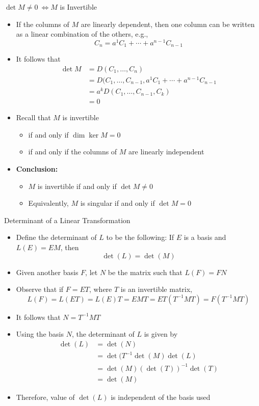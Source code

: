 \documentclass[usenames,dvipsnames,10pt]{beamer}
\begin{document}
\begin{frame}
  {$\det M \ne 0\ \iff M$ is Invertible}

  \begin{itemize}
  \item If the columns of $M$ are linearly dependent, then one column can be written as a linear combination of the others, e.g.,
    \[ C_n = a^1C_1 + \cdots + a^{n-1}C_{n-1}
    \]
  \item It follows that
    \begin{align*}
      \det M &= D(C_1, \dots, C_n)\\
             &= D(C_1, \dots, C_{n-1},a^1C_1 + \cdots + a^{n-1}C_{n-1}\\
             &= a^kD(C_1, \dots, C_{n-1},C_k)\\
             &= 0
    \end{align*}
  \item Recall that $M$ is invertible
    \begin{itemize}
    \item if and only if $\dim \ker M = 0$
    \item if and only if the columns of $M$ are linearly independent
    \end{itemize}
  \item {\bf Conclusion:}
    \begin{itemize}
    \item $M$ is invertible if and only if $\det M \ne 0$
    \item Equivalently, $M$ is singular if and only if $\det M = 0$
    \end{itemize}
  \end{itemize}
\end{frame}

\begin{frame}
  {Determinant of a Linear Transformation}

  \begin{itemize}
  \item Define the determinant of $L$ to be the following: If $E$ is a basis and $L(E) = EM$, then
    \[
      \det(L) = \det(M)
    \]
  \item Given another basis $F$, let $N$ be the matrix such that $L(F) = FN$
  \item Observe that if $F = ET$, where $T$ is an invertible matrix,
    \[
      L(F) = L(ET) = L(E)T = EMT = ET(T^{-1}MT)= F(T^{-1}MT)
    \]
  \item It follows that $N = T^{-1}MT$
  \item Using the basis $N$, the determinant of $L$ is given by
    \begin{align*}
      \det(L) &= \det(N)\\
              &= \det(T^{-1}\det(M)\det(L)\\
              &= \det(M)(\det(T))^{-1}\det(T)\\
              &= \det(M)
    \end{align*}
  \item Therefore, value of $\det(L)$ is independent of the basis used
  \end{itemize}
\end{frame}
\end{document}
